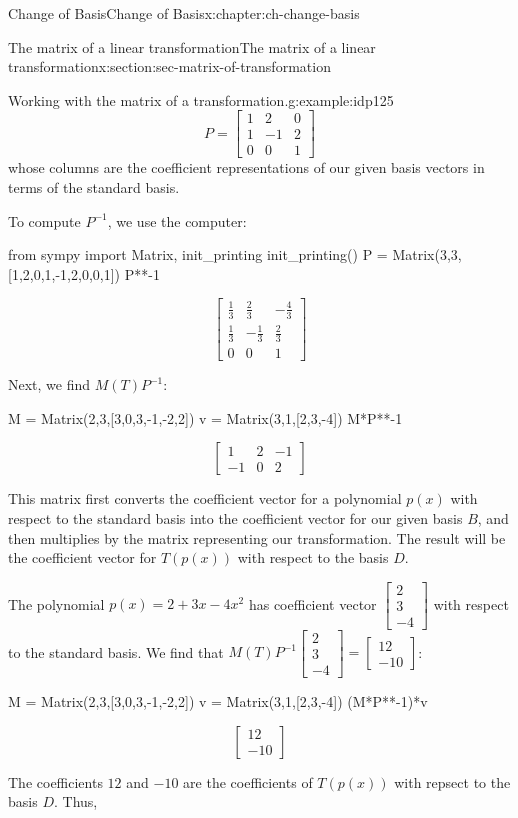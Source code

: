 \documentclass[oneside,10pt,]{book}
\numberwithin{equation}{section}
\newcommand{\bbm}{\begin{bmatrix}}
\newcommand{\ebm}{\end{bmatrix}}
\newcommand{\amp}{&}
\begin{document}
\begin{chapterptx}{Change of Basis}{}{Change of Basis}{}{}{x:chapter:ch-change-basis}
\begin{sectionptx}{The matrix of a linear transformation}{}{The matrix of a linear transformation}{}{}{x:section:sec-matrix-of-transformation}
\begin{example}{Working with the matrix of a transformation.}{g:example:idp125}
\begin{equation*}
P=\bbm 1\amp 2\amp 0\\1\amp -1\amp 2\\0\amp 0\amp 1\ebm
\end{equation*}
whose columns are the coefficient representations of our given basis vectors in terms of the standard basis.%
\par
To compute \(P^{-1}\), we use the computer:%
\begin{sageinput}
from sympy import Matrix, init_printing
init_printing()
P = Matrix(3,3,[1,2,0,1,-1,2,0,0,1])
P**-1
\end{sageinput}
\begin{sageoutput}
\[\bbm \frac13\amp \frac23\amp -\frac43\\ \frac13\amp -\frac13 \amp \frac23\\0\amp 0\amp 1\ebm\]
\end{sageoutput}
Next, we find \(M(T)P^{-1}\):%
\begin{sageinput}
M = Matrix(2,3,[3,0,3,-1,-2,2])
v = Matrix(3,1,[2,3,-4])
M*P**-1
\end{sageinput}
\begin{sageoutput}
\[\bbm 1\amp 2\amp -1\\-1\amp 0\amp 2\ebm\]
\end{sageoutput}
This matrix first converts the coefficient vector for a polynomial \(p(x)\) with respect to the standard basis into the coefficient vector for our given basis \(B\), and then multiplies by the matrix representing our transformation. The result will be the coefficient vector for \(T(p(x))\) with respect to the basis \(D\).%
\par
The polynomial \(p(x) = 2+3x-4x^2\) has coefficient vector \(\bbm 2\\3\\-4\ebm\) with respect to the standard basis. We find that \(M(T)P^{-1}\bbm 2\\3\\-4\ebm = \bbm 12\\-10\ebm\):%
\begin{sageinput}
M = Matrix(2,3,[3,0,3,-1,-2,2])
v = Matrix(3,1,[2,3,-4])
(M*P**-1)*v
\end{sageinput}
\begin{sageoutput}
\[\bbm 12\\-10\ebm\]
\end{sageoutput}
The coefficients \(12\) and \(-10\) are the coefficients of \(T(p(x))\) with repsect to the basis \(D\). Thus,%
\begin{equation*}

\end{equation*}
\end{example}
\end{sectionptx}
\end{chapterptx}
\end{document}
